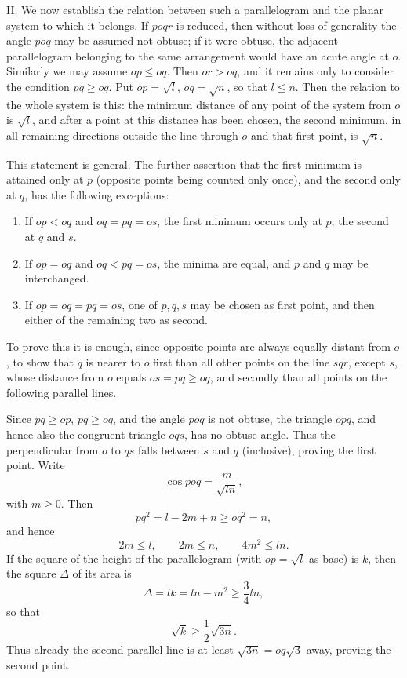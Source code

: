 \documentclass[11pt]{article}
\newcommand{\ordlabel}[1]{#1\textsuperscript{o}}
\begin{document}
II. We now establish the relation between such a parallelogram and the planar system to which it belongs. If $poqr$ is reduced, then without loss of generality the angle $poq$ may be assumed not obtuse; if it were obtuse, the adjacent parallelogram belonging to the same arrangement would have an acute angle at $o$. Similarly we may assume $op\le oq$. Then $or>oq$, and it remains only to consider the condition $pq\ge oq$. Put $op=\sqrt l$, $oq=\sqrt n$, so that $l\le n$. Then the relation to the whole system is this: the minimum distance of any point of the system from $o$ is $\sqrt l$, and after a point at this distance has been chosen, the second minimum, in all remaining directions outside the line through $o$ and that first point, is $\sqrt n$.

This statement is general. The further assertion that the first minimum is attained only at $p$ (opposite points being counted only once), and the second only at $q$, has the following exceptions:
\begin{enumerate}
\item[\ordlabel{1}.] If $op<oq$ and $oq=pq=os$, the first minimum occurs only at $p$, the second at $q$ and $s$.
\item[\ordlabel{2}.] If $op=oq$ and $oq<pq=os$, the minima are equal, and $p$ and $q$ may be interchanged.
\item[\ordlabel{3}.] If $op=oq=pq=os$, one of $p,q,s$ may be chosen as first point, and then either of the remaining two as second.
\end{enumerate}

To prove this it is enough, since opposite points are always equally distant from $o$, to show that $q$ is nearer to $o$ first than all other points on the line $sqr$, except $s$, whose distance from $o$ equals $os=pq\ge oq$, and secondly than all points on the following parallel lines.

Since $pq\ge op$, $pq\ge oq$, and the angle $poq$ is not obtuse, the triangle $opq$, and hence also the congruent triangle $oqs$, has no obtuse angle. Thus the perpendicular from $o$ to $qs$ falls between $s$ and $q$ (inclusive), proving the first point. Write
\[
 \cos poq=\frac{m}{\sqrt{ln}},
\]
with $m\ge0$. Then
\[
 pq^2=l-2m+n\ge oq^2=n,
\]
and hence
\[
 2m\le l,
\qquad 2m\le n,
\qquad 4m^2\le ln.
\]
If the square of the height of the parallelogram (with $op=\sqrt l$ as base) is $k$, then the square $\Delta$ of its area is
\[
 \Delta=lk=ln-m^2\ge \frac34 ln,
\]
so that
\[
 \sqrt{k}\ge \frac12\sqrt{3n}.
\]
Thus already the second parallel line is at least $\sqrt{3n}=oq\sqrt3$ away, proving the second point.
\end{document}
